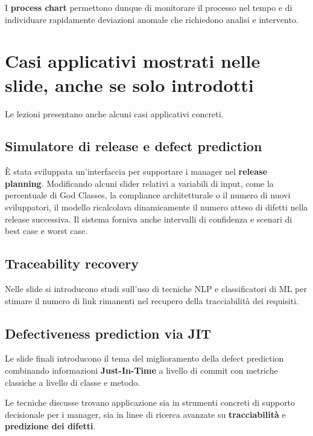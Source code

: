 I \textbf{process chart} permettono dunque di monitorare il processo nel tempo e di individuare rapidamente deviazioni anomale che richiedono analisi e intervento.

\section{Casi applicativi mostrati nelle slide, anche se solo introdotti}

Le lezioni presentano anche alcuni casi applicativi concreti.

\subsection{Simulatore di release e defect prediction}

\begin{notaprof}
È stata sviluppata un'interfaccia per supportare i manager nel \textbf{release planning}. Modificando alcuni slider relativi a variabili di input, come la percentuale di God Classes, la compliance architetturale o il numero di nuovi sviluppatori, il modello ricalcolava dinamicamente il numero atteso di difetti nella release successiva. Il sistema forniva anche intervalli di confidenza e scenari di best case e worst case.
\end{notaprof}

\subsection{Traceability recovery}

\begin{notaslide}
Nelle slide si introducono studi sull'uso di tecniche NLP e classificatori di ML per stimare il numero di link rimanenti nel recupero della tracciabilità dei requisiti.
\end{notaslide}

\subsection{Defectiveness prediction via JIT}

\begin{notaslide}
Le slide finali introducono il tema del miglioramento della defect prediction combinando informazioni \textbf{Just-In-Time} a livello di commit con metriche classiche a livello di classe e metodo.
\end{notaslide}

Le tecniche discusse trovano applicazione sia in strumenti concreti di supporto decisionale per i manager, sia in linee di ricerca avanzate su \textbf{tracciabilità} e \textbf{predizione dei difetti}.

